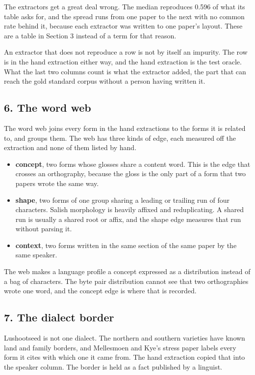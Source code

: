The extractors get a great deal wrong. The median reproduces 0.596 of what its table asks for, and the spread runs from one paper to the next with no common rate behind it, because each extractor was written to one paper's layout. These are a table in Section 3 instead of a term for that reason.

An extractor that does not reproduce a row is not by itself an impurity. The row is in the hand extraction either way, and the hand extraction is the test oracle. What the last two columns count is what the extractor added, the part that can reach the gold standard corpus without a person having written it.

\subsection{6. The word web}

The word web joins every form in the hand extractions to the forms it is related to, and groups them. The web has three kinds of edge, each measured off the extraction and none of them listed by hand.

\begin{itemize}
\item \textbf{concept}, two forms whose glosses share a content word. This is the edge that crosses an orthography, because the gloss is the only part of a form that two papers wrote the same way.
\item \textbf{shape}, two forms of one group sharing a leading or trailing run of four characters. Salish morphology is heavily affixed and reduplicating. A shared run is usually a shared root or affix, and the shape edge measures that run without parsing it.
\item \textbf{context}, two forms written in the same section of the same paper by the same speaker.
\end{itemize}

The web makes a language profile a concept expressed as a distribution instead of a bag of characters. The byte pair distribution cannot see that two orthographies wrote one word, and the concept edge is where that is recorded.

\subsection{7. The dialect border}

Lushootseed is not one dialect. The northern and southern varieties have known land and family borders, and Mellesmoen and Kye's stress paper labels every form it cites with which one it came from. The hand extraction copied that into the speaker column. The border is held as a fact published by a linguist.

